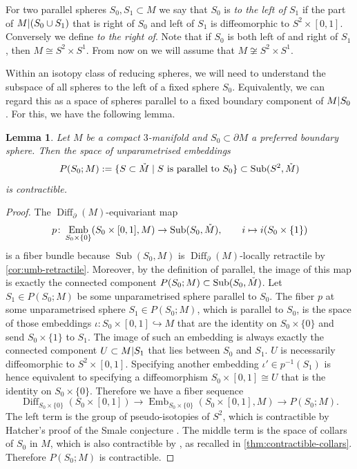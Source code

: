 \documentclass{amsart}
\theoremstyle{plain}
\newtheorem{lem}[thm]{Lemma}
\theoremstyle{definition}
\DeclareMathOperator\Diff{Diff}
\DeclareMathOperator\emb{Emb}
\DeclareMathOperator{\umb}{Sub} %
\newcommand{\interior}[1]{\smash{\mathring{#1}}}
\newcommand{\ca}{\smash{\mid}} %
\begin{document}
    For two parallel spheres $S_0, S_1 \subset M$ we say that $S_0$ is \emph{to the left of $S_1$} if the part of $M \ca (S_0 \cup S_1)$ that is right of $S_0$ and left of $S_1$ is diffeomorphic to $S^2 \times [0,1]$.
    Conversely we define \emph{to the right of}.
%
Note that if $S_0$ is both left of and right of $S_1$, then $M \cong S^2 \times S^1$. From now on we will assume that $M \not\cong S^2 \times S^1$. 

Within an isotopy class of reducing spheres, we will need to understand the subspace of all spheres to the left of a fixed sphere $S_0$. Equivalently, we can regard this as a space of spheres parallel to a fixed boundary component of $M\ca S_0$. For this, we have the following lemma. 

\begin{lem}\label{lem:boundary-parallel-spheres}
    Let $M$ be a compact $3$-manifold and $S_0 \subset \partial M$ a preferred boundary sphere.
    Then the space of unparametrised embeddings 
    \[
         P(S_0; M) := \{ S \subset \interior{M} \;|\; S \text{ is parallel to } S_0 \}
         \subset 
         \umb(S^2, \interior{M})
    \]
    is contractible.
\end{lem}
\begin{proof}
    The $\Diff_\partial(M)$-equivariant map
    \[
        p\colon \emb_{S_0\times\{0\}}( S_0 \times [0,1], M)  \to
        \umb(S_0, \interior{M}), \qquad
        i \mapsto i(S_0 \times \{1\})
    \]
    is a fiber bundle because $\umb(S_0, M)$ is $\Diff_\partial(M)$-locally retractile by \cref{cor:umb-retractile}.
    Moreover, by the definition of parallel, the image of this map is exactly the connected component $P(S_0; M) \subset \umb(S_0, \interior{M})$.
    Let $S_1 \in P(S_0; M)$ be some unparametrised sphere parallel to $S_0$.
    The fiber $p$ at some unparametrised sphere $S_1 \in P(S_0; M)$, which is parallel to $S_0$,
    is the space of those embeddings
    $\iota\colon S_0 \times [0,1] \hookrightarrow M$
    that are the identity on $S_0 \times \{0\}$ and send $S_0 \times \{1\}$ to $S_1$.
    The image of such an embedding is always exactly the connected component $U \subset M \ca S_1$ that lies between $S_0$ and $S_1$. $U$ is necessarily diffeomorphic to $S^2 \times [0,1]$.
    Specifying another embedding $\iota' \in p^{-1}(S_1)$ is hence equivalent to specifying a diffeomorphism $S_0 \times [0,1] \cong U$ that is the identity on $S_0 \times \{0\}$.
    Therefore we have a fiber sequence
    \[
        \Diff_{S_0\times\{0\}}(S_0 \times [0,1]) \to \emb_{S_0 \times \{0\}}(S_0 \times [0, 1], M) \to P(S_0; M).
    \]
    The left term is the group of pseudo-isotopies of $S^2$, which is contractible by Hatcher's proof of the Smale conjecture \cite{Hatcher}.
    The middle term is the space of collars of $S_0$ in $M$, which is also contractible by \cite{Cerf}, as recalled in \cref{thm:contractible-collars}.
    Therefore $P(S_0; M)$ is contractible.
\end{proof}
\end{document}
